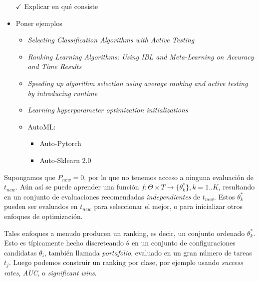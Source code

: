 \begin{itemize}
	\item[$\checkmark$] Explicar en qué consiste
	\item Poner ejemplos
	\begin{itemize}
		\item \textit{Selecting Classification Algorithms with Active Testing}
		\item \textit{Ranking Learning Algorithms: Using IBL and Meta-Learning on Accuracy and Time Results}
		\item \textit{Speeding up algorithm selection using average ranking and active testing by introducing runtime}
		\item \textit{Learning hyperparameter optimization initializations}
		\item AutoML: \begin{itemize}
			\item Auto-Pytorch
			\item Auto-Sklearn 2.0
		\end{itemize}
	\end{itemize}
\end{itemize}

Supongamos que $P_{new} = 0$, por lo que no tenemos acceso a ninguna evaluación de $t_{new}$. Aún así se puede aprender una función $f: \Theta \times T \rightarrow \{\theta^*_k\}, k=1..K$, resultando en un conjunto de evaluaciones recomendadas \textit{independientes} de $t_{new}$. Estos $\theta^*_k$ pueden ser evaluados en $t_{new}$ para seleccionar el mejor, o para inicializar otros enfoques de optimización.

Tales enfoques a menudo producen un ranking, es decir, un conjunto ordenado $\theta^*_k$. Esto es típicamente hecho discreteando $\theta$ en un conjunto de configuraciones candidatas $\theta_i$, también llamada \textit{portafolio}, evaluado en un gran número de tareas $t_j$. Luego podemos construir un ranking por clase, por ejemplo usando \textit{success rates}, \textit{AUC}, o \textit{significant wins}. %

